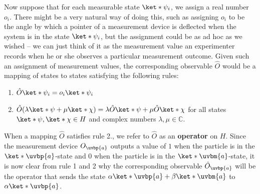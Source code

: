 \documentclass[12pt]{report}
\providecommand{\DIFaddbegin}{} %
\providecommand{\DIFaddend}{} %
\providecommand{\DIFdelbegin}{} %
\providecommand{\DIFdelend}{} %
\begin{document}
Now suppose that for each measurable state $\ket*{\psi_i}$, we assign a real number $o_i$. %
%
There might be a very natural way of doing this, such as assigning  $o_i$ to be the angle by which a pointer of a measurement device is deflected when the system is in the state $\ket*{\psi_i}$,  %
\DIFdelbegin %
\DIFdelend \DIFaddbegin {}\DIFaddend %
but the assignment could be as ad hoc as we wished – we can just think of it as the measurement value an experimenter records when he or she observes a particular measurement outcome. Given such an assignment of measurement values, the corresponding observable $\hat{O}$ would be a mapping of states to states satisfying the following rules:
\begin{enumerate}[noitemsep, nosep, topsep=0pt]
\item $\hat{O}\ket*{\psi_i}=o_i\ket*{\psi_i}$
\item $\hat{O}(\lambda\ket*{\psi}+\mu\ket*{\chi})=\lambda\hat{O}\ket*{\psi}+\mu\hat{O}\ket*{\chi}$  for all states $\ket*{\psi},\ket*{\chi}\in H$ and complex numbers $\lambda,\mu\in\mathbb{C}$.
\end{enumerate}
When a mapping $\hat{O}$ satisfies rule 2., we refer to $\hat{O}$ as an \textbf{operator} on $H$. Since the measurement device $O_{\uvbp{a}}$ outputs a value of $1$ when the particle is in the $\ket*{\uvbp{a}}$-state and $0$ when the particle is in the $\ket*{\uvbm{a}}$-state, it is now clear from rule 1 and 2 why the corresponding observable $\hat{O}_{\uvbp{a}}$ will be the operator that sends the state $\alpha\ket*{\uvbp{a}}+\beta\ket*{\uvbm{a}}$ to $\alpha\ket*{\uvbp{a}}$.
\end{document}
